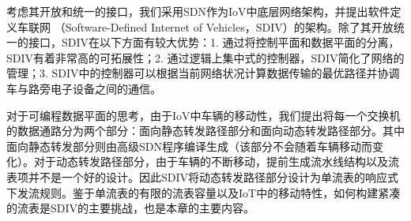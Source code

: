 \documentclass{ctexart}
\begin{document}

考虑其开放和统一的接口，我们采用SDN作为IoV中底层网络架构，并提出软件定义车联网 （Software-Defined Internet of Vehicles，SDIV）的架构。除了其开放统一的接口，SDIV在以下方面有较大优势：1. 通过将控制平面和数据平面的分离，SDIV有着非常高的可拓展性；2. 通过逻辑上集中式的控制器，SDIV简化了网络的管理；3. SDIV中的控制器可以根据当前网络状况计算数据传输的最优路径并协调车与路旁电子设备之间的通信。

对于可编程数据平面的思考，由于IoV中车辆的移动性，我们提出将每一个交换机的数据通路分为两个部分：面向静态转发路径部分和面向动态转发路径部分。其中面向静态转发部分则由高级SDN程序编译生成（该部分不会随着车辆移动而变化）。对于动态转发路径部分，由于车辆的不断移动，提前生成流水线结构以及流表项并不是一个好的设计。因此SDIV将动态转发路径部分设计为单流表的响应式下发流规则。鉴于单流表的有限的流表容量以及IoT中的移动特性，如何构建紧凑的流表是SDIV的主要挑战，也是本章的主要内容。



\end{document}
